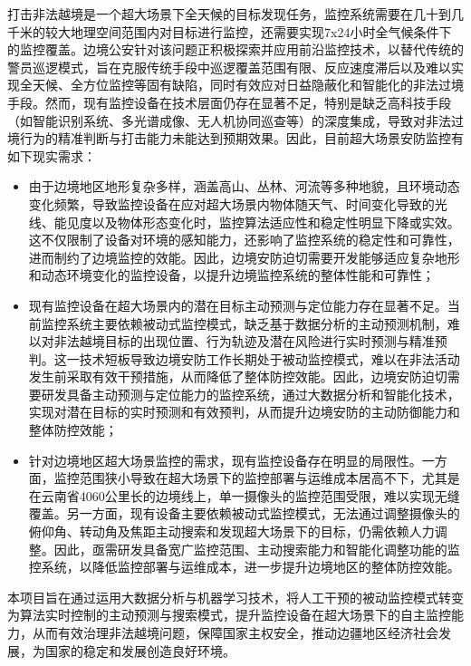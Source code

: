 打击非法越境是一个超大场景下全天候的目标发现任务，监控系统需要在几十到几千米的较大地理空间范围内对目标进行监控，还需要实现7x24小时全气候条件下的监控覆盖。边境公安针对该问题正积极探索并应用前沿监控技术，以替代传统的警员巡逻模式，旨在克服传统手段中巡逻覆盖范围有限、反应速度滞后以及难以实现全天候、全方位监控等固有缺陷，同时有效应对日益隐蔽化和智能化的非法过境手段。然而，现有监控设备在技术层面仍存在显著不足，特别是缺乏高科技手段（如智能识别系统、多光谱成像、无人机协同巡查等）的深度集成，导致对非法过境行为的精准判断与打击能力未能达到预期效果。因此，目前超大场景安防监控有如下现实需求：
\begin{itemize}[left=15pt,label={\textasteriskcentered}]
\item 由于边境地区地形复杂多样，涵盖高山、丛林、河流等多种地貌，且环境动态变化频繁，导致监控设备在应对超大场景内物体随天气、时间变化导致的光线、能见度以及物体形态变化时，监控算法适应性和稳定性明显下降或实效。这不仅限制了设备对环境的感知能力，还影响了监控系统的稳定性和可靠性，进而制约了边境监控的效能。因此，边境安防迫切需要开发能够适应复杂地形和动态环境变化的监控设备，以提升边境监控系统的整体性能和可靠性；
\item 现有监控设备在超大场景内的潜在目标主动预测与定位能力存在显著不足。当前监控系统主要依赖被动式监控模式，缺乏基于数据分析的主动预测机制，难以对非法越境目标的出现位置、行为轨迹及潜在风险进行实时预测与精准预判。这一技术短板导致边境安防工作长期处于被动监控模式，难以在非法活动发生前采取有效干预措施，从而降低了整体防控效能。因此，边境安防迫切需要研发具备主动预测与定位能力的监控系统，通过大数据分析和智能化技术，实现对潜在目标的实时预测和有效预判，从而提升边境安防的主动防御能力和整体防控效能；
\item 针对边境地区超大场景监控的需求，现有监控设备存在明显的局限性。一方面，监控范围狭小导致在超大场景下的监控部署与运维成本居高不下，尤其是在云南省4060公里长的边境线上，单一摄像头的监控范围受限，难以实现无缝覆盖。另一方面，现有设备主要依赖被动式监控模式，无法通过调整摄像头的俯仰角、转动角及焦距主动搜索和发现超大场景下的目标，仍需依赖人力调整。因此，亟需研发具备宽广监控范围、主动搜索能力和智能化调整功能的监控系统，以降低监控部署与运维成本，进一步提升边境地区的整体防控效能。

\end{itemize}


本项目旨在通过运用大数据分析与机器学习技术，将人工干预的被动监控模式转变为算法实时控制的主动预测与搜索模式，提升监控设备在超大场景下的自主监控能力，从而有效治理非法越境问题，保障国家主权安全，推动边疆地区经济社会发展，为国家的稳定和发展创造良好环境。


